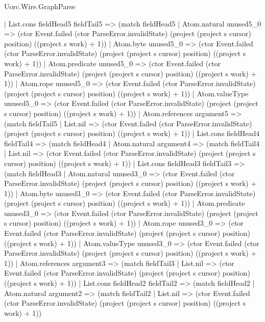 \begin{lexlean}{Uorc.Wire.GraphParse}
\begin{semanticmodule}
{        | List.cons fieldHead5 fieldTail5 => (match fieldHead5
          | Atom.natural unused5_0 => (ctor Event.failed (ctor ParseError.invalidState) (project (project s cursor) position) ((project s work) + 1))
          | Atom.byte unused5_0 => (ctor Event.failed (ctor ParseError.invalidState) (project (project s cursor) position) ((project s work) + 1))
          | Atom.predicate unused5_0 => (ctor Event.failed (ctor ParseError.invalidState) (project (project s cursor) position) ((project s work) + 1))
          | Atom.rope unused5_0 => (ctor Event.failed (ctor ParseError.invalidState) (project (project s cursor) position) ((project s work) + 1))
          | Atom.valueType unused5_0 => (ctor Event.failed (ctor ParseError.invalidState) (project (project s cursor) position) ((project s work) + 1))
          | Atom.references argument5 => (match fieldTail5
            | List.nil => (ctor Event.failed (ctor ParseError.invalidState) (project (project s cursor) position) ((project s work) + 1))
            | List.cons fieldHead4 fieldTail4 => (match fieldHead4
              | Atom.natural argument4 => (match fieldTail4
                | List.nil => (ctor Event.failed (ctor ParseError.invalidState) (project (project s cursor) position) ((project s work) + 1))
                | List.cons fieldHead3 fieldTail3 => (match fieldHead3
                  | Atom.natural unused3_0 => (ctor Event.failed (ctor ParseError.invalidState) (project (project s cursor) position) ((project s work) + 1))
                  | Atom.byte unused3_0 => (ctor Event.failed (ctor ParseError.invalidState) (project (project s cursor) position) ((project s work) + 1))
                  | Atom.predicate unused3_0 => (ctor Event.failed (ctor ParseError.invalidState) (project (project s cursor) position) ((project s work) + 1))
                  | Atom.rope unused3_0 => (ctor Event.failed (ctor ParseError.invalidState) (project (project s cursor) position) ((project s work) + 1))
                  | Atom.valueType unused3_0 => (ctor Event.failed (ctor ParseError.invalidState) (project (project s cursor) position) ((project s work) + 1))
                  | Atom.references argument3 => (match fieldTail3
                    | List.nil => (ctor Event.failed (ctor ParseError.invalidState) (project (project s cursor) position) ((project s work) + 1))
                    | List.cons fieldHead2 fieldTail2 => (match fieldHead2
                      | Atom.natural argument2 => (match fieldTail2
                        | List.nil => (ctor Event.failed (ctor ParseError.invalidState) (project (project s cursor) position) ((project s work) + 1))
}
\end{semanticmodule}
\end{lexlean}
